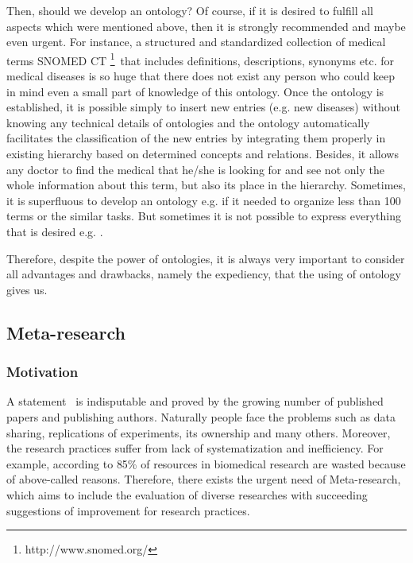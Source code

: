 		Then, should we develop an ontology? Of course, if it is desired to fulfill all aspects which were mentioned above, then it is strongly recommended and maybe even urgent. For instance, a structured and standardized collection of medical terms SNOMED CT \footnote{http://www.snomed.org/}\ that includes definitions, descriptions, synonyms etc. for medical diseases is so huge that there does not exist any person who could keep in mind even a small part of knowledge of this ontology. Once the ontology is established, it is possible simply to insert new entries (e.g. new diseases) without knowing any technical details of ontologies and the ontology automatically facilitates the classification of the new entries by integrating them properly in existing hierarchy based on determined concepts and relations. Besides, it allows any doctor to find the medical that he/she is looking for and see not only the whole information about this term, but also its place in the hierarchy. 
		Sometimes, it is superfluous to develop an ontology e.g. if it needed to organize less than 100 terms or the similar tasks. But sometimes it is not possible to express everything that is desired e.g. \frqq\cite[p. 88]{Fre12}.        
		
		Therefore, despite the power of ontologies, it is always very important to consider all advantages and drawbacks, namely the expediency, that the using of ontology gives us.  
	\subsection{Meta-research}
		\subsubsection{Motivation}
		A statement \frqq \ is indisputable and proved by the growing number of published papers and publishing authors\cite{Ioa14}. Naturally people face the problems such as data sharing, replications of experiments, its ownership and many others. Moreover, the research practices suffer from lack of systematization and inefficiency. For example, according to \cite{Mac14}  85\% of resources in biomedical research are wasted because of above-called reasons. Therefore, there exists the urgent need of Meta-research, which aims to include the evaluation of diverse researches with succeeding suggestions of improvement for research practices.    
		
